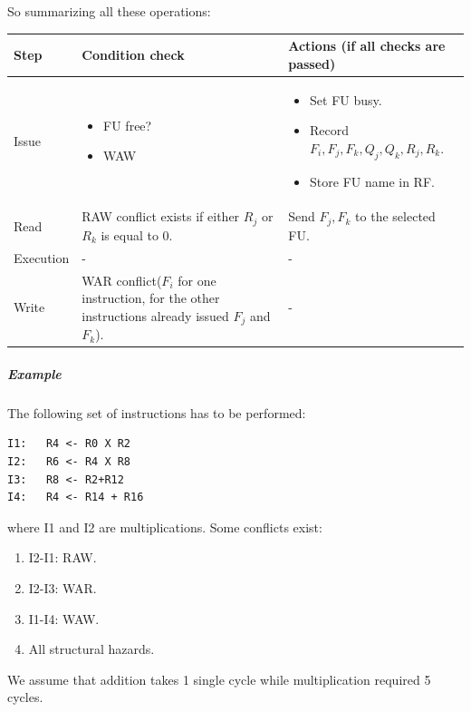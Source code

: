 So summarizing all these operations:

\begin{center}
  \begin{tabular}{|l|p{7 cm}|p{7 cm}|}
    \hline
    Step &    Condition check &   Actions (if all checks are passed)\\
    \hline
    Issue &   \begin{itemize}
          \item FU free?
          \item WAW
          \end{itemize} &     \begin{itemize}
                      \item Set FU busy.
                      \item Record $F_i, F_j, F_k, Q_j, Q_k, R_j, R_k$.
                      \item Store FU name in RF.
                      \end{itemize} \\

    Read&   RAW conflict exists if either $R_j$ or $R_k$ is equal to 0.&
          Send $F_j, F_k$ to the selected FU. \\

    Execution&- & - \\
    Write&    WAR conflict($F_i$ for one instruction, for
    the other instructions already issued
    $F_j$ and $F_k$).& - \\
    \hline
  \end{tabular}
\end{center}

\subparagraph{Example}
The following set of instructions has to be performed:

\begin{verbatim}
I1:   R4 <- R0 X R2
I2:   R6 <- R4 X R8
I3:   R8 <- R2+R12
I4:   R4 <- R14 + R16
\end{verbatim}

where I1 and I2 are multiplications. Some conflicts exist:
\begin{enumerate}
  \item I2-I1: RAW.
  \item I2-I3: WAR.
  \item I1-I4: WAW.
  \item All structural hazards.
\end{enumerate}

We assume that addition takes 1 single cycle while multiplication required 5 cycles.

